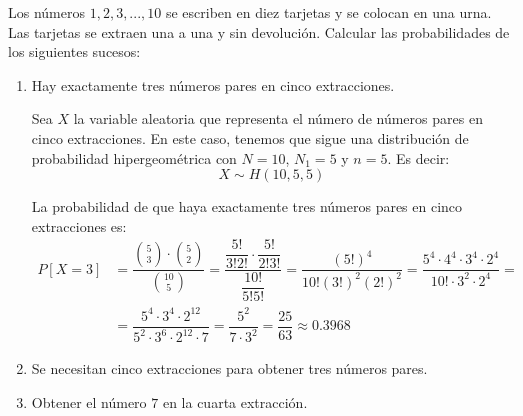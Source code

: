 

\begin{ejercicio}
    Los números $1,2,3,...,10$ se escriben en diez tarjetas y se colocan en una urna. Las tarjetas se
    extraen una a una y sin devolución. Calcular las probabilidades de los siguientes sucesos:
    \begin{enumerate}
        \item Hay exactamente tres números pares en cinco extracciones.
        
        Sea $X$ la variable aleatoria que representa el número de números pares en cinco extracciones. En este caso, tenemos que sigue una distribución de probabilidad hipergeométrica con $N=10$, $N_1=5$ y $n=5$. Es decir:
        \begin{equation*}
            X \sim H(10,5,5)
        \end{equation*}

        La probabilidad de que haya exactamente tres números pares en cinco extracciones es:
        \begin{align*}
            P[X=3] &= \dfrac{\binom{5}{3} \cdot \binom{5}{2}}{\binom{10}{5}} = \dfrac{\dfrac{5!}{3!2!} \cdot \dfrac{5!}{2!3!}}{\dfrac{10!}{5!5!}} = \dfrac{(5!)^4}{10!(3!)^2(2!)^2} = \dfrac{5^4\cdot 4^4 \cdot 3^4 \cdot 2^4}{10!\cdot 3^2\cdot 2^4} =\\
            &= \dfrac{5^4\cdot 3^4 \cdot 2^{12}}{5^2\cdot 3^6\cdot 2^{12}\cdot 7} = \dfrac{5^2}{7\cdot 3^2} = \dfrac{25}{63} \approx 0.3968
        \end{align*}
        \item Se necesitan cinco extracciones para obtener tres números pares.
        
        \item Obtener el número $7$ en la cuarta extracción.
    \end{enumerate}



\end{ejercicio}

